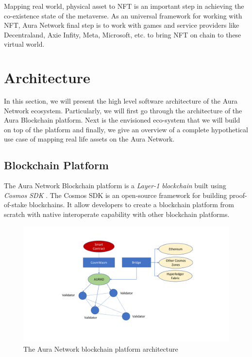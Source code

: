 \documentclass[12pt]{article}
\begin{document}
Mapping real world, physical asset to NFT is an important step in achieving the co-existence state of the metaverse. As an universal framework for working with NFT, Aura Network final step is to work with games and service providers like Decentraland, Axie Infity, Meta, Microsoft, etc. to bring NFT on chain to these virtual world.

\section{Architecture}
In this section, we will present the high level software architecture of the Aura Network ecosystem. Particularly, we will first go through the architecture of the Aura Blockchain platform. Next is the envisioned eco-system that we will build on top of the platform and finally, we give an overview of a complete hypothetical use case of mapping real life assets on the Aura Network.

\subsection{Blockchain Platform}
The Aura Network Blockchain platform is a \emph{Layer-1 blockchain} built using \emph{Cosmos SDK} \cite{kwon2019cosmos}. The Cosmos SDK is an open-source framework for building proof-of-stake blockchains. It allow developers to create a blockchain platform from scratch with native interoperate capability with other blockchain platforms. 

\begin{figure}[ht]
\label{fig:architecture}
\includegraphics[width=\textwidth, trim={5cm 2cm 5cm 0}, clip]{img/architecture.pdf}
\centering
\caption{The Aura Network blockchain platform architecture}
\end{figure}
\end{document}
